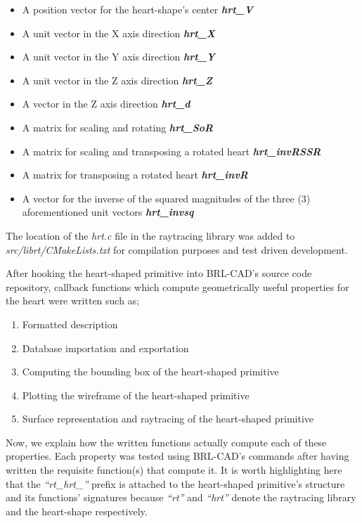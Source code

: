 \begin{itemize}
\item A position vector for the heart-shape's center \textbf{\textit{hrt\_V}}  
\item A unit vector in the X ­axis direction \textbf{\textit{hrt\_X}}  
\item A unit vector in the Y axis direction \textbf{\textit{hrt\_Y}}  
\item A unit vector in the Z axis direction \textbf{\textit{hrt\_Z}}  
\item A vector in the Z ­axis direction \textit{\textbf{hrt\_d}}  
\item A matrix for scaling and rotating \textit{\textbf{hrt\_SoR}}  
\item A matrix for scaling and transposing a rotated heart \textbf{\textit{hrt\_invRSSR}}  
\item A matrix for transposing a rotated heart \textit{\textbf{hrt\_invR}}  
\item A vector for the inverse of the squared magnitudes of the three (3) aforementioned unit vectors \textit{\textbf{hrt\_invsq}}  
\end{itemize}

The   location   of   the   \textit{hrt.c}   file   in   the   raytracing   library   was   added   to  
\textit{src/librt/CMakeLists.txt} for compilation purposes  and test ­driven development.
   
\hspace{30} After   hooking   the   heart-­shaped   primitive   into   BRL-­CAD's   source   code  
repository,  callback functions which compute geometrically useful properties for the heart were written such as;  
 
\begin{enumerate}
\item Formatted description  
\item Database importation and exportation  
\item Computing the bounding box of the heart­-shaped primitive  
\item Plotting the wireframe of the heart­-shaped primitive  
\item Surface representation and raytracing of the heart-­shaped primitive
\end{enumerate}

\hspace{30} Now, we explain how the written functions actually compute each of these properties.
 Each   property   was   tested   using   BRL-­CAD's   commands \cite{36}   after  having   
written   the   requisite   function(s)   that   compute   it.   It   is   worth   highlighting  
here   that   the   \textit{“rt\_hrt\_”}   prefix   is   attached   to   the   heart­-shaped   primitive's   structure  
and   its   functions'   signatures   because   \textit{“rt”}   and   \textit{“hrt”}   denote   the   raytracing   library  
and the heart-shape respectively.  

